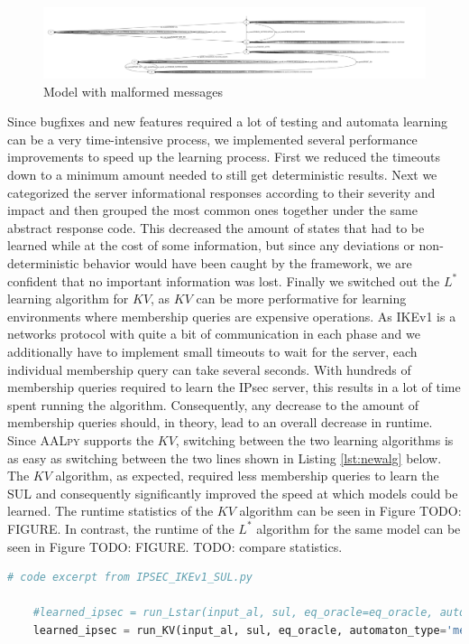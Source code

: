 \begin{figure}
	\centering
	\includegraphics[width=0.7\linewidth]{images/WithFilterWithErrors}
	\caption{Model with malformed messages}
	\label{fig:withfilterwitherrors}
\end{figure}

Since bugfixes and new features required a lot of testing and automata learning can be a very time-intensive process, we implemented several performance improvements to speed up the learning process. First we reduced the timeouts down to a minimum amount needed to still get deterministic results. Next we categorized the server informational responses according to their severity and impact and then grouped the most common ones together under the same abstract response code. This decreased the amount of states that had to be learned while at the cost of some information, but since any deviations or non-deterministic behavior would have been caught by the framework, we are confident that no important information was lost. Finally we switched out the $L^*$ learning algorithm for $KV$, as $KV$ can be more performative for learning environments where membership queries are expensive operations. As IKEv1 is a networks protocol with quite a bit of communication in each phase and we additionally have to implement small timeouts to wait for the server, each individual membership query can take several seconds. With hundreds of membership queries required to learn the IPsec server, this results in a lot of time spent running the algorithm. Consequently, any decrease to the amount of membership queries should, in theory, lead to an overall decrease in runtime. Since \textsc{AALpy} supports the $KV$, switching between the two learning algorithms is as easy as switching between the two lines shown in Listing \ref{lst:newalg} below. The $KV$ algorithm, as expected, required less membership queries to learn the SUL and consequently significantly improved the speed at which models could be learned. The runtime statistics of the $KV$ algorithm can be seen in Figure TODO: FIGURE. In contrast, the runtime of the $L^*$ algorithm for the same model can be seen in Figure TODO: FIGURE. TODO: compare statistics.

\begin{lstlisting}[float=ht, caption=Switching Learning Algorithms, label=lst:newalg, numbers=none, language=python]
	# code excerpt from IPSEC_IKEv1_SUL.py
	
	#learned_ipsec = run_Lstar(input_al, sul, eq_oracle=eq_oracle, automaton_type='mealy', cache_and_non_det_check=True, print_level=3)
	learned_ipsec = run_KV(input_al, sul, eq_oracle, automaton_type='mealy', print_level=3, cex_processing='rs')
\end{lstlisting}

